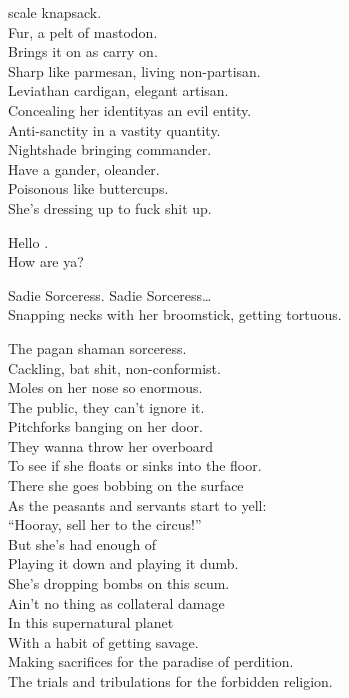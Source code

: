  scale knapsack. \\
Fur, a pelt of mastodon. \\
Brings it on as carry on. \\
Sharp like parmesan, living non-partisan. \\
Leviathan cardigan, elegant artisan. \\
Concealing her identityas an evil entity. \\
Anti-sanctity in a vastity quantity. \\
Nightshade bringing  commander. \\
Have a gander, oleander. \\
Poisonous like buttercups. \\
She's dressing up to fuck shit up. \\


Hello . \\
How are ya? \\


Sadie Sorceress. Sadie Sorceress… \\
Snapping necks with her broomstick, getting tortuous. \\


The pagan shaman sorceress. \\
Cackling, bat shit, non-conformist. \\
Moles on her nose so enormous. \\
The public, they can't ignore it. \\
Pitchforks banging on her door. \\
They wanna throw her overboard \\
To see if she floats or sinks into the floor. \\
There she goes bobbing on the surface \\
As the peasants and servants start to yell: \\
``Hooray, sell her to the circus!'' \\

But she's had enough of \\
Playing it down and playing it dumb. \\
She's dropping bombs on this  scum. \\
Ain't no thing as collateral damage \\
In this supernatural planet \\
With a habit of getting savage. \\
Making sacrifices for the paradise of perdition. \\
The trials and tribulations for the forbidden religion. \\

